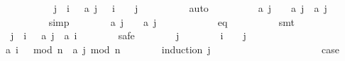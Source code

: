 \begin{isabellebody}
\ \ \ \ \ \ \ \ \isamarkupfalse%
\ {\isacharbackquoteopen}{\isasymforall}\ j\ {\isasymge}\ i\ {\isacharplus}\ {}{\isachardot}\ {\isacharquery}a\ j\ {\isachargreater}\ {}{\isacharbackquoteclose}\ {\isacharbackquoteopen}i\ {\isacharplus}\ {}\ {\isasymle}\ j{\isacharbackquoteclose}\isanewline
\ \ \ \ \ \ \ \ \isamarkupfalse%
\ auto\isanewline
\ \ \ \ \ \ \isamarkupfalse%
\ \isamarkupfalse%
\ {\isachardoublequoteopen}{\isacharquery}a\ {\isacharparenleft}j\ {\isacharplus}\ {}{\isacharparenright}\ {\isacharless}\ {\isacharquery}a\ j\ {\isacharasterisk}\ {\isacharquery}a\ {\isacharparenleft}j\ {\isacharplus}\ {}{\isacharparenright}{\isachardoublequoteclose}\isanewline
\ \ \ \ \ \ \ \ \isamarkupfalse%
\ simp\isanewline
\ \ \ \ \ \ \isamarkupfalse%
\ {\isachardoublequoteopen}{\isacharquery}a\ {\isacharparenleft}j\ {\isacharplus}\ {}{\isacharparenright}\ {\isachargreater}\ {\isacharquery}a\ {\isacharparenleft}j\ {\isacharplus}\ {}{\isacharparenright}{\isachardoublequoteclose}\isanewline
\ \ \ \ \ \ \ \ \isamarkupfalse%
\ eq\isanewline
\ \ \ \ \ \ \ \ \isamarkupfalse%
\ smt\isanewline
\ \ \ \ \isamarkupfalse%
\isanewline
\isanewline
\ \ \ \ \isamarkupfalse%
\ {\isachardoublequoteopen}{\isasymforall}\ j\ {\isachargreater}\ i\ {\isacharplus}\ {}{\isachardot}\ {\isacharquery}a\ j\ {\isachargreater}\ {\isacharquery}a\ {\isacharparenleft}i\ {\isacharplus}\ {}{\isacharparenright}{\isachardoublequoteclose}\isanewline
\ \ \ \ \isamarkupfalse%
\ safe\isanewline
\ \ \ \ \ \ \isamarkupfalse%
\ j\isanewline
\ \ \ \ \ \ \isamarkupfalse%
\ {\isachardoublequoteopen}i\ {\isacharplus}\ {}\ {\isacharless}\ j{\isachardoublequoteclose}\isanewline
\ \ \ \ \ \ \isamarkupfalse%
\ \isamarkupfalse%
\ {\isachardoublequoteopen}a\ {\isacharparenleft}{\isacharparenleft}i\ {\isacharplus}\ {}{\isacharparenright}\ mod\ n{\isacharparenright}\ {\isacharless}\ a\ {\isacharparenleft}j\ mod\ n{\isacharparenright}{\isachardoublequoteclose}\isanewline
\ \ \ \ \ \ \isamarkupfalse%
\ {\isacharparenleft}induction\ j{\isacharparenright}\isanewline
\ \ \ \ \ \ \ \ \isamarkupfalse%
\ {}\isanewline
\ \ \ \ \ \ \ \ \isamarkupfalse%
\ \isamarkupfalse%
\ {\isacharquery}case\isanewline

\end{isabellebody}
